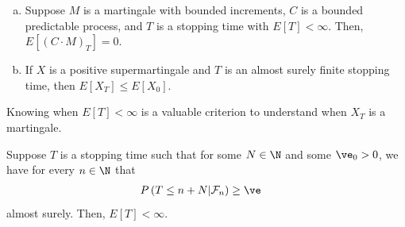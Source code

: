 \documentclass[10pt]{mypackage}
\begin{document}
\begin{corollary}\hfill
  \begin{enumerate}[(a)]
    \item Suppose $M$ is a martingale with bounded increments, $C$ is a bounded predictable process, and $T$ is a stopping time with $E\left[ T \right] < \infty$. Then, $E\left[ \left( C\cdot M \right)_{T} \right] = 0$.
    \item If $X$ is a positive supermartingale and $T$ is an almost surely finite stopping time, then $E\left[ X_T \right] \leq E\left[ X_0 \right]$.
  \end{enumerate}
\end{corollary}
Knowing when $E\left[ T \right] < \infty$ is a valuable criterion to understand when $X_T$ is a martingale.
\begin{lemma}
  Suppose $T$ is a stopping time such that for some $N\in \N$ and some $\ve_0 > 0$, we have for every $n\in \N$ that
  \begin{align*}
    P\left( T\leq n + N | \mathcal{F}_n \right) &\geq \ve
  \end{align*}
  almost surely. Then, $E\left[ T \right] < \infty$.
\end{lemma}
\end{document}
